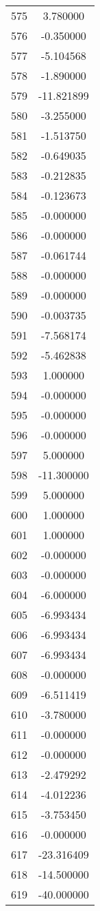 \documentclass[12pt]{article}
\begin{document}
\begin{longtable}{@{}cc@{}}
575 & 3.780000 \\
576 & -0.350000 \\
577 & -5.104568 \\
578 & -1.890000 \\
579 & -11.821899 \\
580 & -3.255000 \\
581 & -1.513750 \\
582 & -0.649035 \\
583 & -0.212835 \\
584 & -0.123673 \\
585 & -0.000000 \\
586 & -0.000000 \\
587 & -0.061744 \\
588 & -0.000000 \\
589 & -0.000000 \\
590 & -0.003735 \\
591 & -7.568174 \\
592 & -5.462838 \\
593 & 1.000000 \\
594 & -0.000000 \\
595 & -0.000000 \\
596 & -0.000000 \\
597 & 5.000000 \\
598 & -11.300000 \\
599 & 5.000000 \\
600 & 1.000000 \\
601 & 1.000000 \\
602 & -0.000000 \\
603 & -0.000000 \\
604 & -6.000000 \\
605 & -6.993434 \\
606 & -6.993434 \\
607 & -6.993434 \\
608 & -0.000000 \\
609 & -6.511419 \\
610 & -3.780000 \\
611 & -0.000000 \\
612 & -0.000000 \\
613 & -2.479292 \\
614 & -4.012236 \\
615 & -3.753450 \\
616 & -0.000000 \\
617 & -23.316409 \\
618 & -14.500000 \\
619 & -40.000000 \\

\end{longtable}
\end{document}
